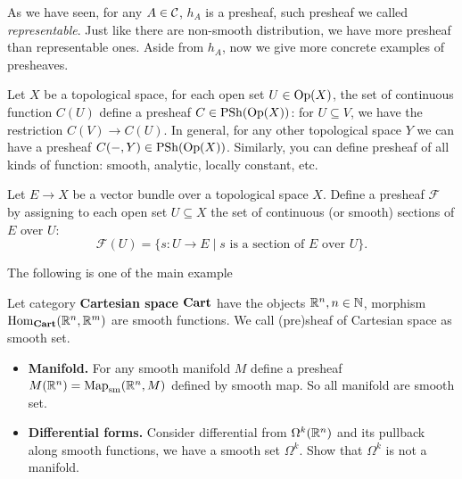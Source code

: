 As we have seen, for any $A\in \mathcal{C}$, $h_A$ is a presheaf, such presheaf we called \emph{representable}. Just like there are non-smooth distribution, we have more presheaf than representable ones. Aside from $h_A$, now we give more concrete examples of presheaves.
\begin{example}
  Let $X$ be a topological space, for each open set $U\in \mathrm{Op}(X)$, the set of continuous function $C(U)$ define a presheaf $C \in \mathrm{PSh}(\mathrm{Op}(X))$: for $U\subseteq V$, we have the restriction $C(V)\to C(U)$. In general, for any other topological space $Y$ we can have a presheaf  $C(-,Y) \in \mathrm{PSh}(\mathrm{Op}(X))$. Similarly, you can define presheaf of all kinds of function: smooth, analytic, locally constant, etc.
\end{example}
\begin{example}
  Let $E \to X$ be a vector bundle over a topological space $X$. Define a presheaf $\mathcal{F}$ by assigning to each open set $U \subseteq X$ the set of continuous (or smooth) sections of $E$ over $U$:
    \[
    \mathcal{F}(U) = \{ s : U \to E \mid s \text{ is a section of } E \text{ over } U \}.
    \]
\end{example}
The following is one of the main example 
\begin{example}
  Let category \textbf{Cartesian space} $\mathbf{Cart}$ have the objects $\mathbb{R}^n, n\in \mathbb{N}$, morphism $\mathrm{Hom}_{\mathbf{Cart}}(\mathbb{R}^n,\mathbb{R}^m)$ are smooth functions. We call (pre)sheaf of Cartesian space as smooth set.
\begin{itemize}
  \item \textbf{Manifold.} For any smooth manifold $M$ define a presheaf $M(\mathbb{R}^n)= \mathrm{Map}_{\mathrm{sm}}(\mathbb{R}^n, M)$ defined by smooth map. So all manifold are smooth set.
  \item \textbf{Differential forms.} Consider differential from $ \Omega^k(\mathbb{R}^n)$ and its pullback along smooth functions, we have a smooth set $\Omega^k$. Show that $\Omega^k$ is not a manifold.
\end{itemize}

\end{example}

